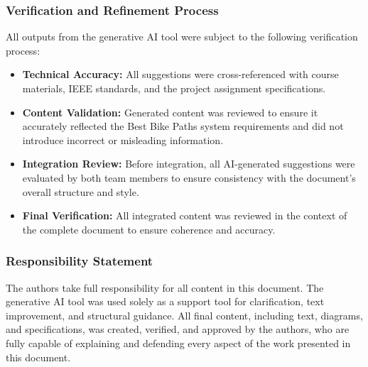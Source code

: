 \subsubsection*{Verification and Refinement Process}

All outputs from the generative AI tool were subject to the following verification process:
\begin{itemize}
    \item \textbf{Technical Accuracy:} All suggestions were cross-referenced with course materials, IEEE standards, and the project assignment specifications.
    \item \textbf{Content Validation:} Generated content was reviewed to ensure it accurately reflected the Best Bike Paths system requirements and did not introduce incorrect or misleading information.
    \item \textbf{Integration Review:} Before integration, all AI-generated suggestions were evaluated by both team members to ensure consistency with the document's overall structure and style.
    \item \textbf{Final Verification:} All integrated content was reviewed in the context of the complete document to ensure coherence and accuracy.
\end{itemize}

\subsubsection*{Responsibility Statement}

The authors take full responsibility for all content in this document. The generative AI tool was used solely as a support tool for clarification, text improvement, and structural guidance. All final content, including text, diagrams, and specifications, was created, verified, and approved by the authors, who are fully capable of explaining and defending every aspect of the work presented in this document.

